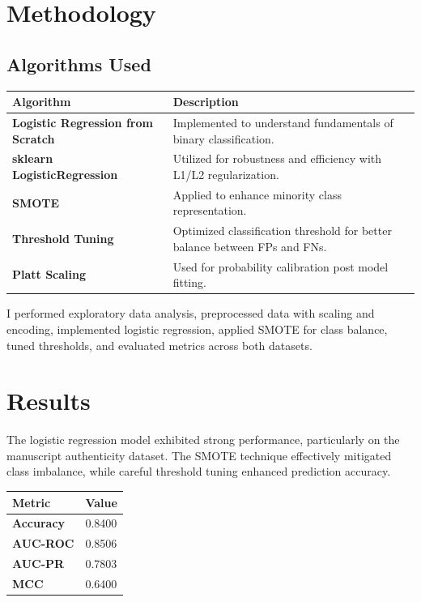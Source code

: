 \documentclass[11pt,a4paper]{article}
\begin{document}
\section{Methodology}

\subsection{Algorithms Used}

\begin{tabularx}{\linewidth}{@{}>{\bfseries}l X @{}}
  \arrayrulecolor{tableheader}
  \toprule
  \rowcolor{tableheader} Algorithm & Description \\
  \midrule
  \rowcolor{white} Logistic Regression from Scratch & Implemented to understand fundamentals of binary classification. \\
  \rowcolor{tablerow} sklearn LogisticRegression & Utilized for robustness and efficiency with L1/L2 regularization. \\
  \rowcolor{white} SMOTE & Applied to enhance minority class representation. \\
  \rowcolor{tablerow} Threshold Tuning & Optimized classification threshold for better balance between FPs and FNs. \\
  \rowcolor{white} Platt Scaling & Used for probability calibration post model fitting. \\
  \bottomrule
\end{tabularx}

I performed exploratory data analysis, preprocessed data with scaling and encoding, implemented logistic regression, applied SMOTE for class balance, tuned thresholds, and evaluated metrics across both datasets.

\section{Results}

The logistic regression model exhibited strong performance, particularly on the manuscript authenticity dataset. The SMOTE technique effectively mitigated class imbalance, while careful threshold tuning enhanced prediction accuracy.

\vspace{4pt}

\begin{tabularx}{\linewidth}{@{}>{\bfseries}l X @{}}
  \arrayrulecolor{tableheader}
  \toprule
  \rowcolor{tableheader} Metric & Value \\
  \midrule
  \rowcolor{white} Accuracy & 0.8400 \\
  \rowcolor{tablerow} AUC-ROC & 0.8506 \\
  \rowcolor{white} AUC-PR & 0.7803 \\
  \rowcolor{tablerow} MCC & 0.6400 \\
  \bottomrule
\end{tabularx}
\end{document}
